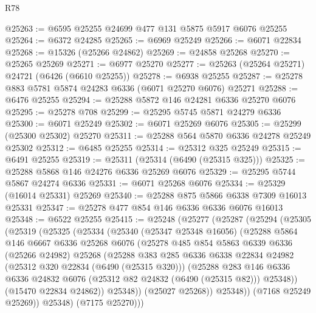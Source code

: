 \begin{lexlean}{R78}
\begin{coremodule}
@25263 := @6595 @25255 @24699 @477 @131 @5875 @5917 @6076 @25255
@25264 := @6372 @24285
@25265 := @6969 @25249
@25266 := @6071 @22834
@25268 := @15326 (@25266 @24862)
@25269 := @24858 @25268
@25270 := @25265 @25269
@25271 := @6977 @25270
@25277 := @25263 (@25264 @25271) @24721 (@6426 (@6610 @25255))
@25278 := @6938 @25255
@25287 := @25278 @883 @5781 @5874 @24283 @6336 (@6071 @25270 @6076) @25271
@25288 := @6476 @25255
@25294 := @25288 @5872 @146 @24281 @6336 @25270 @6076
@25295 := @25278 @708
@25299 := @25295 @5745 @5871 @24279 @6336
@25300 := @6071 @25249
@25302 := @6071 @25269 @6076
@25305 := @25299 (@25300 @25302) @25270
@25311 := @25288 @564 @5870 @6336 @24278 @25249 @25302
@25312 := @6485 @25255
@25314 := @25312 @325 @25249
@25315 := @6491 @25255
@25319 := @25311 (@25314 (@6490 (@25315 @325)))
@25325 := @25288 @5868 @146 @24276 @6336 @25269 @6076
@25329 := @25295 @5744 @5867 @24274 @6336
@25331 := @6071 @25268 @6076
@25334 := @25329 (@16014 @25331) @25269
@25340 := @25288 @875 @5866 @6338 @7309 @16013 @25331
@25347 := @25278 @477 @854 @146 @6336 @6336 @6076 @16013
@25348 := @6522 @25255
@25415 := @25248
    (@25277
      (@25287
        (@25294
          (@25305
            (@25319
              (@25325
                (@25334
                  (@25340
                    (@25347 @25348 @16056)
                    (@25288
                      @5864
                      @146
                      @6667
                      @6336
                      @25268
                      @6076
                      (@25278
                        @485
                        @854
                        @5863
                        @6339
                        @6336
                        (@25266 @24982)
                        @25268
                        (@25288
                          @383
                          @285
                          @6336
                          @6338
                          @22834
                          @24982
                          (@25312 @320 @22834 (@6490 (@25315 @320)))
                          (@25288
                            @283
                            @146
                            @6336
                            @6336
                            @24832
                            @6076
                            (@25312 @82 @24832 (@6490 (@25315 @82)))
                            @25348))
                        (@15470 @22834 @24862))
                      @25348))
                  (@25027 @25268))
                @25348))
            (@7168 @25249 @25269))
          @25348)
        (@7175 @25270)))

\end{coremodule}
\end{lexlean}
